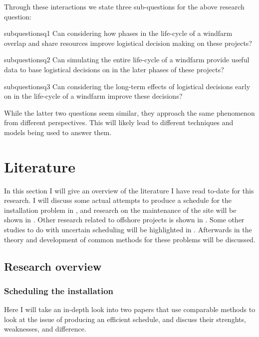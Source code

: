 \documentclass[a4paper,12pt]{article}
\begin{document}
Through these interactions we state three sub-questions for the above research question:

\begin{restatable}{subquestion}{sq1}
\label{sq1}
Can considering how phases in the life-cycle of a windfarm overlap and share resources improve logistical decision making on these projects?
\end{restatable}

\begin{restatable}{subquestion}{sq2}
\label{sq2}
Can simulating the entire life-cycle of a windfarm provide useful data to base logistical decisions on in the later phases of these projects?
\end{restatable}

\begin{restatable}{subquestion}{sq3}
\label{sq3}
Can considering the long-term effects of logistical decisions early on in the life-cycle of a windfarm improve these decisions? 
\end{restatable}

While the latter two questions seem similar, they approach the same phenomenon from different perspectives. This will likely lead to different techniques and models being used to answer them. 

\pagebreak

\section{Literature} \label{s:lit}
In this section I will give an overview of the literature I have read to-date for this research. I will discuss some actual attempts to produce a schedule for the installation problem in , and research on the maintenance of the site will be shown in . Other research related to offshore projects is shown in . Some other studies to do with uncertain scheduling will be highlighted in .  Afterwards in  the theory and development of common methods for these problems will be discussed.

\subsection{Research overview} \label{ss:rese}

\subsubsection{Scheduling the installation} \label{sss:sched}
Here I will take an in-depth look into two papers that use comparable methods to look at the issue of producing an efficient schedule, and discuss their strenghts, weaknesses, and difference.
\end{document}
